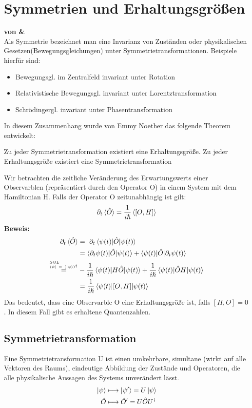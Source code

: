 \documentclass[Ex4_Zusammenfassung.tex]{subfiles}
\begin{document}
\chapter{Symmetrien und Erhaltungsgrößen}
\textbf{von \mitsch \& \soeren} \\ 

Als Symmetrie bezeichnet man eine Invarianz von Zuständen oder physikalischen Gesetzen(Bewegungsgleichungen) unter Symmetrietransformationen.
Beispiele hierfür sind:
\begin{itemize}
\item Bewegungsgl. im Zentralfeld invariant unter Rotation
\item Relativistische Bewegungsgl. invariant unter Lorentztransformation
\item Schrödingergl. invariant unter Phasentransformation
\end{itemize}
In diesem Zusammenhang wurde von Emmy Noether das folgende Theorem entwickelt:
\begin{tcolorbox}[title= Noether-Theorem,colback=red!50!white]
Zu jeder Symmetrietransformation existiert eine Erhaltungsgröße. \newline
Zu jeder Erhaltungsgröße existiert eine Symmetrietransformation
\end{tcolorbox}

Wir betrachten die zeitliche Veränderung des Erwartungswerts einer Observarblen (repräsentiert durch den Operator O) in einem System mit dem Hamiltonian H. Falls der Operator O zeitunabhängig ist gilt:
\begin{equation}
\partial_t \braket{\hat{O}} = \frac{1}{i\hslash} \braket{[O,H]}
\end{equation}
\textbf{Beweis:}
	\begin{align*}
	\partial_t \braket{\hat{O}} &= \ \partial_t \braket{\psi(t)|\hat{O}|\psi(t)} \\ 
	&=\braket{\partial_t \psi(t)|\hat{O}|\psi(t)} + \braket{\psi(t)|\hat{O}|\partial_t \psi(t)} \\ \stackrel{^{SGL}_{\bra{\psi} \  = \ (\ket{\psi})^{\dag}}}{=} &-\frac{1}{i\hslash} \braket{\psi(t)|H\hat{O}|\psi(t)} + \frac{1}{i\hslash} \braket{\psi(t)|\hat{O} H |\psi(t)} \\ 
	&= \frac{1}{i\hslash} \braket{\psi(t)|[O,H]|\psi(t)}
	\end{align*}
Das bedeutet, dass eine Observarble O eine Erhaltungsgröße ist, falls $[H,O] = 0$.  In diesem Fall gibt es erhaltene Quantenzahlen. 
\section{Symmetrietransformation}
Eine Symmetrietransformation U ist einen umkehrbare, simultane (wirkt auf alle Vektoren des Raums), eindeutige Abbildung der Zustände und Operatoren, die alle physikalische Aussagen des Systems unverändert lässt.
\begin{align}
\ket{\psi} &\longmapsto \ket{\psi'} = U \ket{\psi} \\
\hat{O} &\longmapsto \hat{O}' = U \hat{O} U^{\dag}
\end{align}
\end{document}
